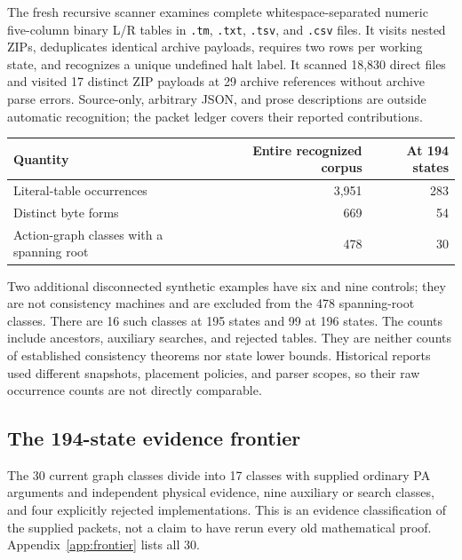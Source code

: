 \documentclass[10pt,letterpaper]{article}
\newcommand{\file}[1]{\nolinkurl{#1}}
\begin{document}
The fresh recursive scanner examines complete whitespace-separated numeric
five-column binary L/R tables in \file{.tm}, \file{.txt}, \file{.tsv}, and
\file{.csv} files. It visits nested ZIPs, deduplicates identical archive
payloads, requires two rows per working state, and recognizes a unique
undefined halt label. It scanned 18,830 direct files and visited 17 distinct
ZIP payloads at 29 archive references without archive parse errors.
Source-only, arbitrary JSON, and prose descriptions are outside automatic
recognition; the packet ledger covers their reported contributions.

\begin{center}
\begin{tabular}{@{}lrr@{}}\toprule
Quantity & Entire recognized corpus & At 194 states\\\midrule
Literal-table occurrences & 3,951 & 283\\
Distinct byte forms & 669 & 54\\
Action-graph classes with a spanning root & 478 & 30\\\bottomrule
\end{tabular}
\end{center}
Two additional disconnected synthetic examples have six and nine controls;
they are not consistency machines and are excluded from the 478 spanning-root
classes. There are 16 such classes at 195 states and 99 at 196 states.
The counts include ancestors, auxiliary searches, and rejected tables.
They are neither counts of established consistency theorems nor state lower
bounds. Historical reports used different snapshots, placement policies,
and parser scopes, so their raw occurrence counts are not directly comparable.

\subsection{The 194-state evidence frontier}

The 30 current graph classes divide into 17 classes with supplied ordinary
PA arguments and independent physical evidence, nine auxiliary or search
classes, and four explicitly rejected implementations. This is an
evidence classification of the supplied packets, not a claim to have rerun
every old mathematical proof. Appendix~\ref{app:frontier} lists all 30.
\end{document}
